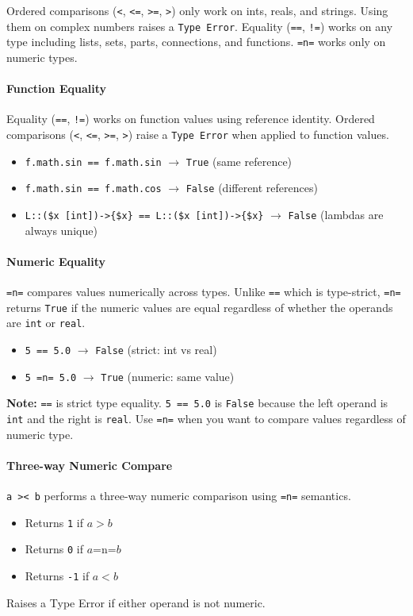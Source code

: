 Ordered comparisons (\texttt{<}, \texttt{<=}, \texttt{>=}, \texttt{>}) only work on ints, reals, and strings. Using them on complex numbers raises a \texttt{Type Error}. Equality (\texttt{==}, \texttt{!=}) works on any type including lists, sets, parts, connections, and functions. \texttt{=n=} works only on numeric types.

\paragraph{Function Equality}
Equality (\texttt{==}, \texttt{!=}) works on function values using reference identity. Ordered comparisons (\texttt{<}, \texttt{<=}, \texttt{>=}, \texttt{>}) raise a \texttt{Type Error} when applied to function values.
\begin{itemize}
\item \texttt{f.math.sin == f.math.sin} $\rightarrow$ \texttt{True} (same reference)
\item \texttt{f.math.sin == f.math.cos} $\rightarrow$ \texttt{False} (different references)
\item \texttt{L::(\$x [int])-\texttt{>}\{\$x\} == L::(\$x [int])-\texttt{>}\{\$x\}} $\rightarrow$ \texttt{False} (lambdas are always unique)
\end{itemize}

\paragraph{Numeric Equality}
\texttt{=n=} compares values numerically across types. Unlike \texttt{==} which is type-strict, \texttt{=n=} returns \texttt{True} if the numeric values are equal regardless of whether the operands are \texttt{int} or \texttt{real}.

\begin{itemize}
\item \texttt{5 == 5.0} $\rightarrow$ \texttt{False} (strict: int vs real)
\item \texttt{5 =n= 5.0} $\rightarrow$ \texttt{True} (numeric: same value)
\end{itemize}

\textbf{Note:} \texttt{==} is strict type equality. \texttt{5 == 5.0} is \texttt{False} because the left operand is \texttt{int} and the right is \texttt{real}. Use \texttt{=n=} when you want to compare values regardless of numeric type.

\paragraph{Three-way Numeric Compare}
\texttt{a >< b} performs a three-way numeric comparison using \texttt{=n=} semantics.
\begin{itemize}
\item Returns \texttt{1} if $a > b$
\item Returns \texttt{0} if $a \mathbin{\texttt{=n=}} b$
\item Returns \texttt{-1} if $a < b$
\end{itemize}
Raises a Type Error if either operand is not numeric.

